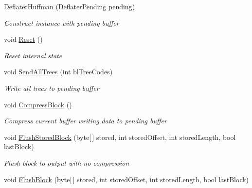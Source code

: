 \begin{DoxyCompactItemize}
\item 
\hyperlink{class_i_c_sharp_code_1_1_sharp_zip_lib_1_1_zip_1_1_compression_1_1_deflater_huffman_a6acbaec44721ba72436a73ecc1e0ec29}{Deflater\+Huffman} (\hyperlink{class_i_c_sharp_code_1_1_sharp_zip_lib_1_1_zip_1_1_compression_1_1_deflater_pending}{Deflater\+Pending} \hyperlink{class_i_c_sharp_code_1_1_sharp_zip_lib_1_1_zip_1_1_compression_1_1_deflater_huffman_ab905a4997487a36bab2c23abefa1d50a}{pending})
\begin{DoxyCompactList}\small\item\em Construct instance with pending buffer \end{DoxyCompactList}\item 
void \hyperlink{class_i_c_sharp_code_1_1_sharp_zip_lib_1_1_zip_1_1_compression_1_1_deflater_huffman_a7a7f2daab9daea8c08f46b187a94202d}{Reset} ()
\begin{DoxyCompactList}\small\item\em Reset internal state \end{DoxyCompactList}\item 
void \hyperlink{class_i_c_sharp_code_1_1_sharp_zip_lib_1_1_zip_1_1_compression_1_1_deflater_huffman_a0e6c9eccd350186bf87b782f2227da31}{Send\+All\+Trees} (int bl\+Tree\+Codes)
\begin{DoxyCompactList}\small\item\em Write all trees to pending buffer \end{DoxyCompactList}\item 
void \hyperlink{class_i_c_sharp_code_1_1_sharp_zip_lib_1_1_zip_1_1_compression_1_1_deflater_huffman_a7b15c0717797c4ba0d161639ca985524}{Compress\+Block} ()
\begin{DoxyCompactList}\small\item\em Compress current buffer writing data to pending buffer \end{DoxyCompactList}\item 
void \hyperlink{class_i_c_sharp_code_1_1_sharp_zip_lib_1_1_zip_1_1_compression_1_1_deflater_huffman_a7d0e1539fb4979259b7b4f144206f82a}{Flush\+Stored\+Block} (byte\mbox{[}$\,$\mbox{]} stored, int stored\+Offset, int stored\+Length, bool last\+Block)
\begin{DoxyCompactList}\small\item\em Flush block to output with no compression \end{DoxyCompactList}\item 
void \hyperlink{class_i_c_sharp_code_1_1_sharp_zip_lib_1_1_zip_1_1_compression_1_1_deflater_huffman_a6947ca15ef87e23db8f98e0d5bd82340}{Flush\+Block} (byte\mbox{[}$\,$\mbox{]} stored, int stored\+Offset, int stored\+Length, bool last\+Block)

\end{DoxyCompactItemize}
